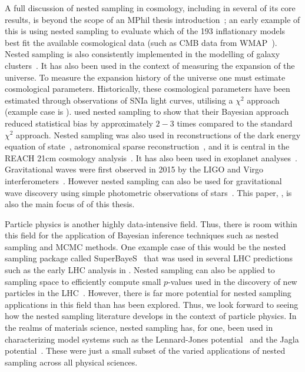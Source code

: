 A full discussion of nested sampling in cosmology, including in several of its core results, is beyond the scope of an MPhil thesis introduction~\cite{Ashton_2022}; an early example of this is \cite{Martin_2011} using nested sampling to evaluate which of the 193 inflationary models best fit the available cosmological data (such as CMB data from WMAP~\cite{Spergel_2003}).  Nested sampling is also consistently implemented in the modelling of galaxy clusters~\cite{Allen_2002,Allen_2011}. It has also been used in the context of measuring the expansion of the universe. To measure the expansion history of the universe one must estimate cosmological parameters. Historically, these cosmological parameters have been estimated through observations of SNIa light curves, utilising a $\chi^2$ approach (example case is \cite{Conley_2010}). \cite{10.1111/j.1365-2966.2011.19584.x} used nested sampling to show that their Bayesian approach reduced statistical bias by approximately $2-3$ times compared to the standard $\chi^2$ approach. Nested sampling was also used in reconstructions of the dark energy equation of state~\cite{Zhao_2017,Hee_2016}, astronomical sparse reconstruction~\cite{Higson_2018}, and it is central in the REACH 21cm cosmology analysis~\cite{Anstey_2021}. It has also been used in exoplanet analyses~\cite{Hall_2018,Ahrer_2021}. Gravitational waves were first observed in 2015 by the LIGO and Virgo interferometers~\cite{2015,Acernese_2014}. However nested sampling can also be used for gravitational wave discovery using simple photometric observations of stars~\cite{Mihaylov_2020}. This paper, \cite{Mihaylov_2020}, is also the main focus of  of this thesis. 


Particle physics is another highly data-intensive field. Thus, there is room within this field for the application of Bayesian inference techniques such as nested sampling and MCMC methods. One example case of this would be the nested sampling package called SuperBayeS~\cite{Feroz_2011,Austri_2006,Trotta_2008} that was used in several LHC predictions such as the early LHC analysis in \cite{Trotta_2011}. Nested sampling can also be applied to sampling space to efficiently compute small $p$-values used in the discovery of new particles in the LHC~\cite{Fowlie_2022}. However, there is far more potential for nested sampling applications in this field than has been explored. Thus, we look forward to seeing how the nested sampling literature develops in the context of particle physics. In the realms of materials science, nested sampling has, for one, been used in characterizing model systems such as the Lennard-Jones potential~\cite{Baldock_2016,wilson_gelb_nielsen_2015} and the Jagla potential~\cite{Bart_k_2021}. These were just a small subset of the varied applications of nested sampling across all physical sciences. 

